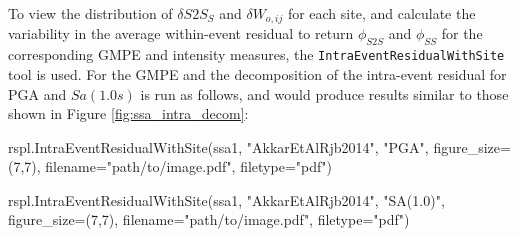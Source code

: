 To view the distribution of $\delta S2S_S$ and $\delta W_{o,ij}$ for each site, and calculate the variability in the average within-event residual to return $\phi_{S2S}$ and $\phi_{SS}$ for the corresponding GMPE and intensity measures, the \verb=IntraEventResidualWithSite= tool is used. For the \textcite{Akkar_etal2014} GMPE and the decomposition of the intra-event residual for PGA and $Sa \left( {1.0s} \right)$ is run as follows, and would produce results similar to those shown in Figure \ref{fig:ssa_intra_decom}:

\begin{python}
rspl.IntraEventResidualWithSite(ssa1,
                                "AkkarEtAlRjb2014",
                                "PGA",
                                figure_size=(7,7),
                                filename="path/to/image.pdf",
                                filetype="pdf")
                                
rspl.IntraEventResidualWithSite(ssa1,
                                "AkkarEtAlRjb2014",
                                "SA(1.0)",
                                figure_size=(7,7),
                                filename="path/to/image.pdf",
                                filetype="pdf")
\end{python}


